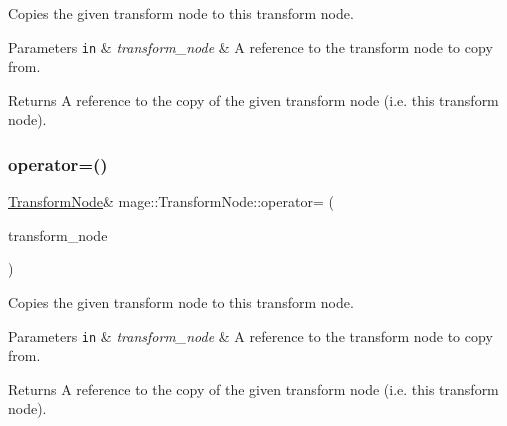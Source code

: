 Copies the given transform node to this transform node.


\begin{DoxyParams}[1]{Parameters}
\mbox{\tt in}  & {\em transform\+\_\+node} & A reference to the transform node to copy from. \\
\hline
\end{DoxyParams}
\begin{DoxyReturn}{Returns}
A reference to the copy of the given transform node (i.\+e. this transform node). 
\end{DoxyReturn}
\hypertarget{classmage_1_1_transform_node_a48c94a56f7d6693a5b6ca61841084249}{}\label{classmage_1_1_transform_node_a48c94a56f7d6693a5b6ca61841084249} 
\subsubsection{\texorpdfstring{operator=()}{operator=()}\hspace{0.1cm}{\footnotesize\ttfamily [2/2]}}
{\footnotesize\ttfamily \hyperlink{classmage_1_1_transform_node}{Transform\+Node}\& mage\+::\+Transform\+Node\+::operator= (\begin{DoxyParamCaption}\item[{\hyperlink{classmage_1_1_transform_node}{Transform\+Node} \&\&}]{transform\+\_\+node }\end{DoxyParamCaption})\hspace{0.3cm}{\ttfamily [delete]}}

Copies the given transform node to this transform node.


\begin{DoxyParams}[1]{Parameters}
\mbox{\tt in}  & {\em transform\+\_\+node} & A reference to the transform node to copy from. \\
\hline
\end{DoxyParams}
\begin{DoxyReturn}{Returns}
A reference to the copy of the given transform node (i.\+e. this transform node). 
\end{DoxyReturn}
\hypertarget{classmage_1_1_transform_node_a95fa10424273f915a13c120dfd33b0cb}{}\label{classmage_1_1_transform_node_a95fa10424273f915a13c120dfd33b0cb} 
